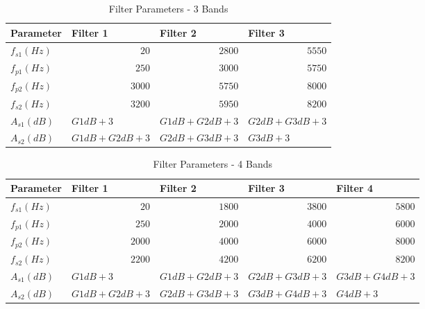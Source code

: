 \documentclass[12pt, onecolumn]{article}
\begin{document}
\begin{appendices}
\begin{table}[htbp]
  \centering
  \caption{Filter Parameters - 3 Bands}
    \begin{tabular}{|l|l|l|l|}
    \hline
    \textbf{Parameter} & \textbf{Filter 1} & \textbf{Filter 2} & \textbf{Filter 3} \\
    \hline
    $f_{s1} (Hz)$   & \multicolumn{1}{r|}{$ 20$ } & \multicolumn{1}{r|}{$ 2800$ } & \multicolumn{1}{r|}{$ 5550$ } \\
    \hline
    $f_{p1} (Hz)$   & \multicolumn{1}{r|}{$ 250$ } & \multicolumn{1}{r|}{$ 3000$ } & \multicolumn{1}{r|}{$ 5750$ } \\
    \hline
    $f_{p2} (Hz)$   & \multicolumn{1}{r|}{$ 3000$ } & \multicolumn{1}{r|}{$ 5750$ } & \multicolumn{1}{r|}{$ 8000$ } \\
    \hline
    $f_{s2} (Hz)$   & \multicolumn{1}{r|}{$ 3200$ } & \multicolumn{1}{r|}{$ 5950$ } & \multicolumn{1}{r|}{$ 8200$ } \\
    \hline
    $A_{s1} (dB)$   &$  G1dB + 3$  & $ G1dB + G2dB + 3$  & $ G2dB + G3dB + 3$  \\
    \hline
    $A_{s2} (dB)$   & $ G1dB + G2dB + 3$  & $ G2dB + G3dB + 3 $ & $ G3dB + 3$  \\
    \hline
    \end{tabular}%
  \label{tab:filtPara3Band}%
\end{table}%


\begin{table}[htbp]
  \centering
  \caption{Filter Parameters - 4 Bands}
  \begin{adjustbox}{width=0.9\linewidth}
    \begin{tabular}{|l|l|l|l|l|}
    \hline
    \textbf{Parameter} & \textbf{Filter 1} & \textbf{Filter 2} & \textbf{Filter 3} & \textbf{Filter 4} \\
    \hline
    $f_{s1} (Hz)$   & \multicolumn{1}{r|}{$20$} & \multicolumn{1}{r|}{$1800$} & \multicolumn{1}{r|}{$3800$} & \multicolumn{1}{r|}{$5800$} \\
    \hline
    $f_{p1} (Hz)$   & \multicolumn{1}{r|}{$250$} & \multicolumn{1}{r|}{$2000$} & \multicolumn{1}{r|}{$4000$} & \multicolumn{1}{r|}{$6000$} \\
    \hline
    $f_{p2} (Hz)$   & \multicolumn{1}{r|}{$2000$} & \multicolumn{1}{r|}{$4000$} & \multicolumn{1}{r|}{$6000$} & \multicolumn{1}{r|}{$8000$} \\
    \hline
    $f_{s2} (Hz)$   & \multicolumn{1}{r|}{$2200$} & \multicolumn{1}{r|}{$4200$} & \multicolumn{1}{r|}{$6200$} & \multicolumn{1}{r|}{$8200$} \\
    \hline
    $A_{s1} (dB)  $ &$ G1dB + 3 $&$ G1dB + G2dB + 3 $&$ G2dB + G3dB + 3$ & $G3dB + G4dB + 3$ \\
    \hline
    $A_{s2} (dB)$   & $G1dB + G2dB + 3$ & $G2dB + G3dB + 3 $& $G3dB + G4dB + 3$ &$ G4dB + 3 $\\
    \hline
    \end{tabular}%
    \end{adjustbox}
  \label{tab:filtPara4Band}%
\end{table}%


\end{appendices}
\end{document}
